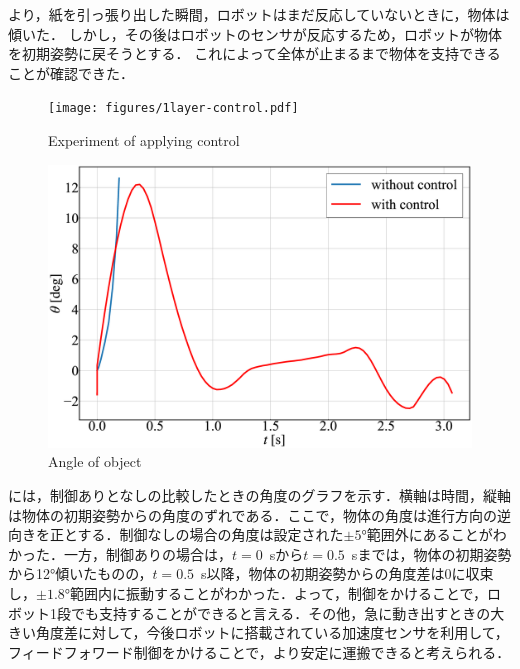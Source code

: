 より，紙を引っ張り出した瞬間，ロボットはまだ反応していないときに，物体は傾いた．
しかし，その後はロボットのセンサが反応するため，ロボットが物体を初期姿勢に戻そうとする．
これによって全体が止まるまで物体を支持できることが確認できた．
\begin{figure}[tb]
  \centering
  \texttt{[image: figures/1layer-control.pdf]}
  \caption{Experiment of applying control}
  \label{fig:control}
\end{figure}
\begin{figure}[tb]
  \centering
  \includegraphics[width=0.8\columnwidth]{figures/angle-control.eps}
  \caption{Angle of object}
  \label{fig:angle}
\end{figure}
には，制御ありとなしの比較したときの角度のグラフを示す．横軸は時間，縦軸は物体の初期姿勢からの角度のずれである．ここで，物体の角度は進行方向の逆向きを正とする．制御なしの場合の角度は設定された$\pm5$\si{\degree}範囲外にあることがわかった．一方，制御ありの場合は，$t=0$~sから$t=0.5$~sまでは，物体の初期姿勢から12\si{\degree}傾いたものの，$t=0.5$~s以降，物体の初期姿勢からの角度差は0に収束し，$\pm1.8$\si{\degree}範囲内に振動することがわかった．よって，制御をかけることで，ロボット1段でも支持することができると言える．その他，急に動き出すときの大きい角度差に対して，今後ロボットに搭載されている加速度センサを利用して，フィードフォワード制御をかけることで，より安定に運搬できると考えられる．